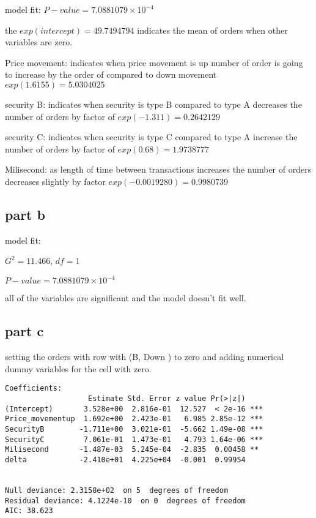 \documentclass[]{article}
\begin{document}
model fit: \(P-value= 7.0881079\times 10^{-4}\)

the \(exp(intercept) = 49.7494794\) indicates the mean of orders when
other variables are zero.

Price movement: indicates when price movement is up number of order is
going to increase by the order of compared to down movement
\(exp(1.6155)= 5.0304025\)

security B: indicates when security is type B compared to type A
decreases the number of orders by factor of \(exp(-1.311)= 0.2642129\)

security C: indicates when security is type C compared to type A
increase the number of orders by factor of \(exp(0.68)= 1.9738777\)

Milisecond: as length of time between transactions increases the number
of orders decreases slightly by factor \(exp(-0.0019280)= 0.9980739\)

\subsection{part b}\label{part-b-1}

model fit:

\(G^2 =11.466\), \(df=1\)

\(P-value= 7.0881079\times 10^{-4}\)

all of the variables are significant and the model doesn't fit well.

\subsection{part c}\label{part-c-1}

setting the orders with row with (B, Down ) to zero and adding numerical
dummy variables for the cell with zero.

\begin{verbatim}
Coefficients:
                   Estimate Std. Error z value Pr(>|z|)    
(Intercept)       3.528e+00  2.816e-01  12.527  < 2e-16 ***
Price_movementup  1.692e+00  2.423e-01   6.985 2.85e-12 ***
SecurityB        -1.711e+00  3.021e-01  -5.662 1.49e-08 ***
SecurityC         7.061e-01  1.473e-01   4.793 1.64e-06 ***
Milisecond       -1.487e-03  5.245e-04  -2.835  0.00458 ** 
delta            -2.410e+01  4.225e+04  -0.001  0.99954    


Null deviance: 2.3158e+02  on 5  degrees of freedom
Residual deviance: 4.1224e-10  on 0  degrees of freedom
AIC: 38.623
\end{verbatim}
\end{document}
